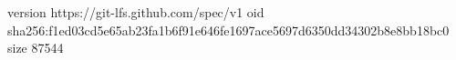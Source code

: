 version https://git-lfs.github.com/spec/v1
oid sha256:f1ed03cd5e65ab23fa1b6f91e646fe1697ace5697d6350dd34302b8e8bb18bc0
size 87544
